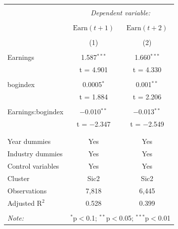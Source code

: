 \documentclass[a4paper]{article}
\begin{document}
\begin{center}
\begin{longtable}{@{\extracolsep{5pt}}lcc} 
\\[-1.8ex]\hline 
\hline \\[-1.8ex] 
 & \multicolumn{2}{c}{\textit{Dependent variable:}} \\ 
\cline{2-3} 
\\[-1.8ex] & \(\text{Earn}(t{+}1)\) & \(\text{Earn}(t{+}2)\) \\ 
\\[-1.8ex] & (1) & (2)\\ 
\hline \\[-1.8ex] 
 Earnings & 1.587$^{***}$ & 1.660$^{***}$ \\ 
  & t = 4.901 & t = 4.330 \\ 
  & & \\ 
 bogindex & 0.0005$^{*}$ & 0.001$^{**}$ \\ 
  & t = 1.884 & t = 2.206 \\ 
  & & \\ 
 Earnings:bogindex & $-$0.010$^{**}$ & $-$0.013$^{**}$ \\ 
  & t = $-$2.347 & t = $-$2.549 \\ 
  & & \\ 
\hline \\[-1.8ex] 
Year dummies & Yes & Yes \\ 
Industry dummies & Yes & Yes \\ 
Control variables & Yes & Yes \\ 
Cluster & Sic2 & Sic2 \\ 
Observations & 7,818 & 6,445 \\ 
Adjusted R$^{2}$ & 0.528 & 0.399 \\ 
\hline 
\hline \\[-1.8ex] 
\textit{Note:}  & \multicolumn{2}{r}{$^{*}$p$<$0.1; $^{**}$p$<$0.05; $^{***}$p$<$0.01} \\ 
\end{longtable}
\end{center}
\end{document}
